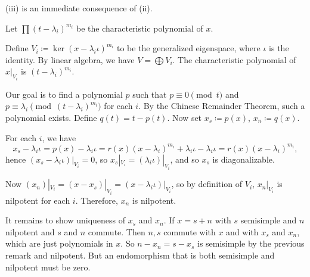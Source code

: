 (iii) is an immediate consequence of (ii).

Let $\prod (t - \lambda_i)^{m_i}$ be the characteristic polynomial of $x$.

Define $V_i\coloneqq \ker(x - \lambda_i\iota)^{m_i}$ to be the generalized
eigenspace, where $\iota$ is the identity. By linear algebra, we have
$V = \bigoplus V_i$.
The characteristic polynomial of $x|_{V_i}$ is $(t - \lambda_i)^{m_i}$.

Our goal is to find a polynomial $p$ such that $p\equiv 0\pmod{t}$ and
$p\equiv \lambda_i\pmod{(t - \lambda_i)^{m_i}}$ for each $i$. By the Chinese
Remainder Theorem, such a polynomial exists. Define $q(t) = t - p(t)$.
Now set $x_s \coloneqq p(x)$, $x_n\coloneqq q(x)$.

For each $i$, we have
\[ x_s - \lambda_i\iota = p(x) - \lambda_i\iota = r(x)(x - \lambda_i)^{m_i} + \lambda_i\iota - \lambda_i\iota = r(x)(x - \lambda_i)^{m_i}, \]
hence $(x_s - \lambda_i\iota)|_{V_i} = 0$, so $x_s|_{V_i} = (\lambda_i\iota)|_{V_i}$,
and so $x_s$ is diagonalizable.

Now $(x_n)|_{V_i} = (x - x_s)|_{V_i} = (x - \lambda_i\iota)|_{V_i}$, so by
definition of $V_i$, $x_n|_{V_i}$ is nilpotent for each $i$. Therefore,
$x_n$ is nilpotent.

It remains to show uniqueness of $x_s$ and $x_n$. If $x = s + n$ with $s$ semisimple
and $n$ nilpotent and $s$ and $n$ commute. Then $n, s$ commute with $x$ and with
$x_s$ and $x_n$, which are just polynomials in $x$. So $n - x_n = s - x_s$ is semisimple
by the previous remark and nilpotent. But an endomorphism that is both semisimple
and nilpotent must be zero.
